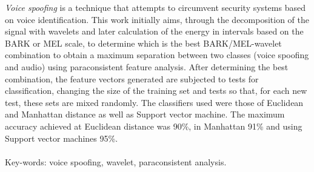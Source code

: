 \begin{myenv}{1.5}
	\fontsize{12}{\baselineskip} \selectfont \onehalfspacing
	\par \null
	\par \null
	\par \textit{Voice spoofing} is a technique that attempts to circumvent security systems based on voice identification. This work initially aims, through the decomposition of the signal with wavelets and later calculation of the energy in intervals based on the BARK or MEL scale, to determine which is the best BARK/MEL-wavelet combination to obtain a maximum separation between two classes (voice spoofing and audio) using paraconsistent feature analysis. After determining the best combination, the feature vectors generated are subjected to tests for classification, changing the size of the training set and tests so that, for each new test, these sets are mixed randomly. The classifiers used were those of Euclidean and Manhattan distance as well as Support vector machine. The maximum accuracy achieved at Euclidean distance was 90\%, in Manhattan 91\% and using Support vector machines 95\%.\\\\
	Key-words: voice spoofing, wavelet, paraconsistent analysis.
\end{myenv}